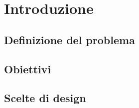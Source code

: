 \chapter{Introduzione}
\label{chap:introduzione}

\section{Definizione del problema}

\section{Obiettivi}

\section{Scelte di design}
